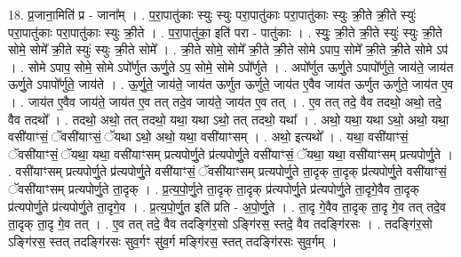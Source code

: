 \documentclass[17pt]{extarticle}
\begin{document}
18. प्र॒जाना॒मिति॑ प्र - जाना᳚म् । . प॒रा॒पातु॑काः स्युः स्युः परा॒पातु॑काः परा॒पातु॑काः स्युः क्री॒ते क्री॒ते स्युः॑ परा॒पातु॑काः परा॒पातु॑काः स्युः क्री॒ते । . प॒रा॒पातु॑का॒ इति॑ परा - पातु॑काः । . स्युः॒ क्री॒ते क्री॒ते स्युः॑ स्युः क्री॒ते सोमे॒ सोमे᳚ क्री॒ते स्युः॑ स्युः क्री॒ते सोमे᳚ । . क्री॒ते सोमे॒ सोमे᳚ क्री॒ते क्री॒ते सोमे ऽपाप॒ सोमे᳚ क्री॒ते क्री॒ते सोमे ऽप॑ । . सोमे ऽपाप॒ सोमे॒ सोमे ऽपो᳚र्णुत ऊर्णु॒ते ऽप॒ सोमे॒ सोमे ऽपो᳚र्णुते । . अपो᳚र्णुत ऊर्णु॒ते ऽपापो᳚र्णुते॒ जाय॑ते॒ जाय॑त ऊर्णु॒ते ऽपापो᳚र्णुते॒ जाय॑ते । . ऊ॒र्णु॒ते॒ जाय॑ते॒ जाय॑त ऊर्णुत ऊर्णुते॒ जाय॑त ए॒वैव जाय॑त ऊर्णुत ऊर्णुते॒ जाय॑त ए॒व । . जाय॑त ए॒वैव जाय॑ते॒ जाय॑त ए॒व तत् तदे॒व जाय॑ते॒ जाय॑त ए॒व तत् । . ए॒व तत् तदे॒ वैव तदथो॒ अथो॒ तदे॒ वैव तदथो᳚ । . तदथो॒ अथो॒ तत् तदथो॒ यथा॒ यथा ऽथो॒ तत् तदथो॒ यथा᳚ । . अथो॒ यथा॒ यथा ऽथो॒ अथो॒ यथा॒ वसी॑याꣳसं॒ ॅवसी॑याꣳसं॒ ॅयथा ऽथो॒ अथो॒ यथा॒ वसी॑याꣳसम् । . अथो॒ इत्यथो᳚ । . यथा॒ वसी॑याꣳसं॒ ॅवसी॑याꣳसं॒ ॅयथा॒ यथा॒ वसी॑याꣳसम् प्रत्यपोर्णु॒ते प्र॑त्यपोर्णु॒ते वसी॑याꣳसं॒ ॅयथा॒ यथा॒ वसी॑याꣳसम् प्रत्यपोर्णु॒ते । . वसी॑याꣳसम् प्रत्यपोर्णु॒ते प्र॑त्यपोर्णु॒ते वसी॑याꣳसं॒ ॅवसी॑याꣳसम् प्रत्यपोर्णु॒ते ता॒दृक् ता॒दृक् प्र॑त्यपोर्णु॒ते वसी॑याꣳसं॒ ॅवसी॑याꣳसम् प्रत्यपोर्णु॒ते ता॒दृक् । . प्र॒त्य॒पो॒र्णु॒ते ता॒दृक् ता॒दृक् प्र॑त्यपोर्णु॒ते प्र॑त्यपोर्णु॒ते ता॒दृगे॒वैव ता॒दृक् प्र॑त्यपोर्णु॒ते प्र॑त्यपोर्णु॒ते ता॒दृगे॒व । . प्र॒त्य॒पो॒र्णु॒त इति॑ प्रति - अ॒पो॒र्णु॒ते । . ता॒दृ गे॒वैव ता॒दृक् ता॒दृ गे॒व तत् तदे॒व ता॒दृक् ता॒दृ गे॒व तत् । . ए॒व तत् तदे॒ वैव तदङ्गि॑र॒सो ऽङ्गि॑रस॒ स्तदे॒ वैव तदङ्गि॑रसः । . तदङ्गि॑र॒सो ऽङ्गि॑रस॒ स्तत् तदङ्गि॑रसः सुव॒र्गꣳ सु॑व॒र्ग मङ्गि॑रस॒ स्तत् तदङ्गि॑रसः सुव॒र्गम् । \newline
\end{document}
